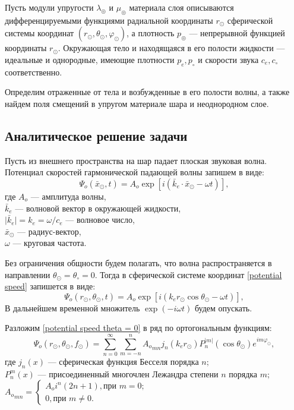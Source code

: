 Пусть модули упругости $\lambda_\circledcirc$ и $\mu_\circledcirc$ материала слоя описываются дифференцируемыми функциями радиальной координаты $r_\odot$ сферической системы координат $(r_\odot, \theta_\odot, \varphi_\odot)$, а плотность $p_\circledcirc$ --- непрерывной функцией координаты $r_\odot$.  Окружающая тело и находящаяся в его полости жидкости --- идеальные и однородные, имеющие плотности $p_e, p_\circ$ и скорости звука $c_e, c_\circ$ соответственно. 

Определим отраженные от тела и возбужденные в его полости волны, а также найдем поля смещений в упругом материале шара и неоднородном слое.


\newpage
\subsection{Аналитическое решение задачи}

Пусть из внешнего пространства на шар падает плоская звуковая волна. Потенциал скоростей гармонической падающей волны запишем в виде:
\begin{equation}\label{potential speed}
\Psi_o(\bar{x}_\odot, t) = A_o \exp\left[i\left(\bar{k}_e\!\cdot\!\bar{x}_\odot-\omega t\right)\right],
\end{equation}
где $A_o$ --- амплитуда волны, \\
$\bar{k}_e$ --- волновой вектор в окружающей жидкости,  \\
$\lvert\bar{k}_e\rvert = k_e = \omega / c_e$ --- волновое число, \\
$\bar{x}_\odot$ --- радиус-вектор, \\
$\omega$ --- круговая частота.

 Без ограничения общности будем полагать, что волна распространяется в направлении $\theta_\odot = \theta_\circ = 0$. Тогда в сферической системе координат \eqref{potential speed} запишется в виде:
\begin{equation}\label{potential speed theta = 0}
\Psi_o(r_\odot, \theta_\odot, t) = A_o \exp\left[i\left(k_e r_\odot\cos\theta_\odot - \omega t\right)\right],
\end{equation}
В дальнейшем временной множитель $\exp(-i\omega t)$ будем опускать.

Разложим \eqref{potential speed theta = 0} в ряд по ортогональным функциям:
\begin{equation}
\Psi_o(r_\odot, \theta_\odot, f_\odot) = \sum\limits_{n=0}^\infty\sum\limits_{m=-n}^n {A_o}_{mn}j_n(k_e r_\odot)P_n^{\lvert m\rvert}(\cos\theta_\odot) e^{im\varphi_\odot},
\end{equation}
где $j_n(x)$ --- сферическая функция Бесселя порядка $n;$\\
$P_n^m(x)$ --- присоединенный многочлен Лежандра степени $n$ порядка $m;$\\
${A_o}_{mn} = 
\begin{cases}
A_o i^n(2n+1), \text{при } m=0;\\
0, \text{при } m \ne 0.
\end{cases}
$

